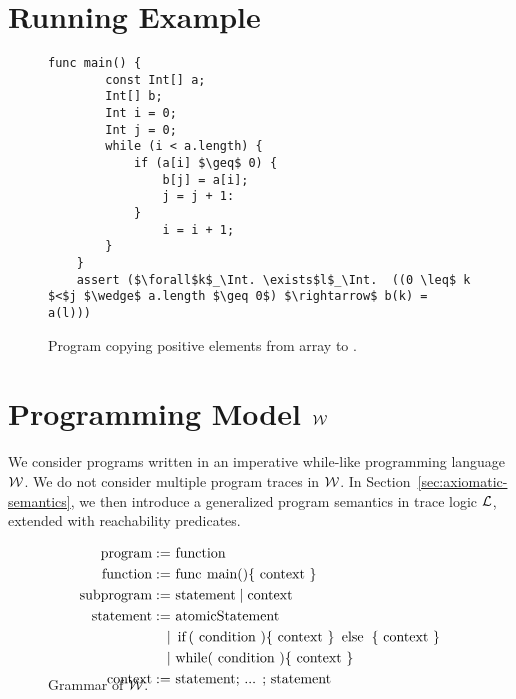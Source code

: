 \section{Running Example}\label{sec:running}

\begin{figure} 
	\begin{lstlisting}[mathescape]
	func main() {
		const Int[] a;	
		Int[] b;
		Int i = 0;
		Int j = 0;
		while (i < a.length) {
			if (a[i] $\geq$ 0) {
				b[j] = a[i]; 
				j = j + 1: 
			}
				i = i + 1;
		}
	}
	assert ($\forall$k$_\Int. \exists$l$_\Int.  ((0 \leq$ k $<$j $\wedge$ a.length $\geq 0$) $\rightarrow$ b(k) = a(l)))
	\end{lstlisting}
	\caption{Program copying positive elements from array  to .}\vspace*{-.5em}
	\label{fig:running}
\end{figure}

\section{Programming Model  $\mathcal{W}$} \label{sec:model}
We consider 
programs written in an imperative while-like programming language $\mathcal{W}$. 
We do not consider 
multiple program traces in $\mathcal{W}$.
In
Section~\ref{sec:axiomatic-semantics}, we then introduce a generalized
program semantics in trace logic $\mathcal{L}$, extended with reachability predicates.

\begin{figure}[t!]
	\centering
	\begin{align*}
	\text{program}    :=& \text{ function}\\
	\text{function}    :=& \text{ \while{func main()\{} \text{context} \while{\}} }\\
	\text{subprogram} :=& \text{ statement} \mid \text{context}\\
	\text{statement} :=& \text{ atomicStatement}\\
	\mid& \text{ \while{if(} \text{condition} \while{)\{} \text{context} \while{\} else \{} \text{context} \while{\}}}\\
	\mid& \text{ \while{while(} \text{condition} \while{)\{} \text{context} \while{\}}}\\
	\text{context} :=& \text{ statement; ... ; statement}\\[-2em]
	\end{align*}
	\caption{Grammar of $\mathcal{W}$.\vspace*{-2em}}
	\label{fig:while-grammar}
\end{figure}

